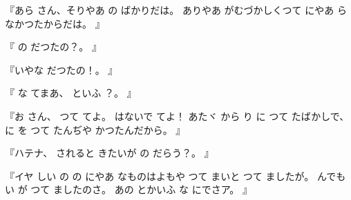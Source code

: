 『あら
さん、そりやあ
の
ばかりだは。
ありやあ
がむづかしくつて
にやあ
らなかつたからだは。
』

『
の
だつたの？。
』

『いやな
だつたの！。
』

『
な
てまあ、
といふ
？。
』

『お
さん、
つて
てよ。
はないで
てよ！
あたヾ
から
り
に
つて
たばかしで、
に
を
つて
たんぢや
かつたんだから。
』

『ハテナ、
されると
きたいが
の
だらう？。
』

『イヤ
しい
の
の
にやあ
なものはよもや
つて
まいと
つて
ましたが。
んでも
い
が
つて
ましたのさ。
あの
とかいふ
な
にでさア。
』

